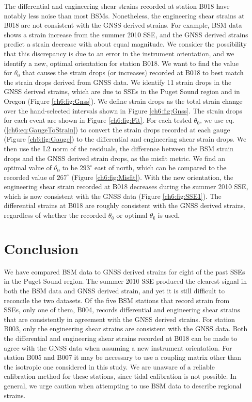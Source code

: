 The differential and engineering shear strains recorded at station
B018 have notably less noise than most BSMs. Nonetheless, the
engineering shear strains at B018 are not consistent with the GNSS
derived strains. For example, BSM data shows a strain increase from
the summer 2010 SSE, and the GNSS derived strains predict a strain
decrease with about equal magnitude. We consider the possibility that
this discrepancy is due to an error in the instrument orientation, and
we identify a new, optimal orientation for station B018. We want to
find the value for $\theta_0$ that causes the strain drops (or
increases) recorded at B018 to best match the strain drops derived
from GNSS data. We identify 11 strain drops in the GNSS derived
strains, which are due to SSEs in the Puget Sound region and in Oregon
(Figure \ref{ch6:fig:Gnss}). We define strain drops as the total strain
change over the hand-selected intervals shown in Figure
\ref{ch6:fig:Gnss}. The strain drops for each event are shown in Figure
\ref{ch6:fig:Fit}. For each tested $\theta_0$, we use eq.
(\ref{ch6:eq:GaugeToStrain}) to convert the strain drops recorded at each
gauge (Figure \ref{ch6:fig:Gauge}) to the differential and engineering
shear strain drops. We then use the L2 norm of the residuals, the
difference between the BSM strain drops and the GNSS derived strain
drops, as the misfit metric. We find an optimal value of $\theta_0$ to
be $293^\circ$ east of north, which can be compared to the recorded
value of $267^\circ$ (Figure \ref{ch6:fig:Misfit}). With the new
orientation, the engineering shear strain recorded at B018 decreases
during the summer 2010 SSE, which is now consistent with the GNSS data
(Figure \ref{ch6:fig:SSE1}). The differential strains at B018 are roughly
consistent with the GNSS derived strains, regardless of whether the
recorded $\theta_0$ or optimal $\theta_0$ is used.

\section{Conclusion}
We have compared BSM data to GNSS derived strains for eight of the
past SSEs in the Puget Sound region. The summer 2010 SSE produced the
clearest signal in both the BSM data and GNSS derived strain, and yet
it is still difficult to reconcile the two datasets. Of the five BSM
stations that record strain from SSEs, only one of them, B004, records
differential and engineering shear strains that are consistently in
agreement with the GNSS derived strains. For station B003, only the
engineering shear strains are consistent with the GNSS data. Both the
differential and engineering shear strains recorded at B018 can be
made to agree with the GNSS data when assuming a new instrument
orientation. For station B005 and B007 it may be necessary to use a
coupling matrix other than the isotropic one considered in this study.
We are unaware of a reliable calibration method for these stations,
since tidal calibration is not possible. In general, we urge caution
when attempting to use BSM data to describe regional strains.

